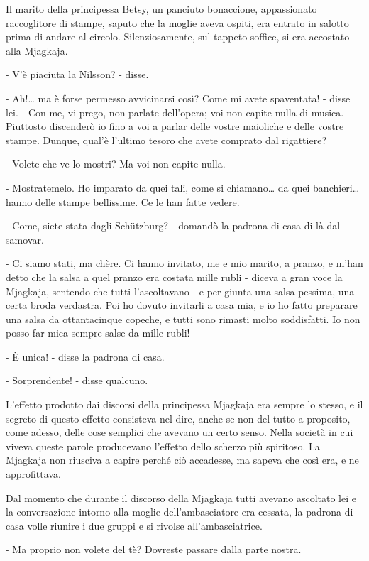 Il marito della principessa Betsy, un panciuto bonaccione, appassionato raccoglitore di stampe, saputo che la moglie aveva ospiti, era entrato in salotto prima di andare al circolo. Silenziosamente, sul tappeto soffice, si era accostato alla Mjagkaja. 

- V'è piaciuta la Nilsson? - disse. 

- Ah!\ldots{} ma è forse permesso avvicinarsi così? Come mi avete spaventata! - disse lei. - Con me, vi prego, non parlate dell'opera; voi non capite nulla di musica. Piuttosto discenderò io fino a voi a parlar delle vostre maioliche e delle vostre stampe. Dunque, qual'è l'ultimo tesoro che avete comprato dal rigattiere? 

- Volete che ve lo mostri? Ma voi non capite nulla. 

- Mostratemelo. Ho imparato da quei tali, come si chiamano\ldots{} da quei banchieri\ldots{} hanno delle stampe bellissime. Ce le han fatte vedere. 

- Come, siete stata dagli Schützburg? - domandò la padrona di casa di là dal samovar. 

- Ci siamo stati, ma chère. Ci hanno invitato, me e mio marito, a pranzo, e m'han detto che la salsa a quel pranzo era costata mille rubli - diceva a gran voce la Mjagkaja, sentendo che tutti l'ascoltavano - e per giunta una salsa pessima, una certa broda verdastra. Poi ho dovuto invitarli a casa mia, e io ho fatto preparare una salsa da ottantacinque copeche, e tutti sono rimasti molto soddisfatti. Io non posso far mica sempre salse da mille rubli! 

- È unica! - disse la padrona di casa. 

- Sorprendente! - disse qualcuno. 

L'effetto prodotto dai discorsi della principessa Mjagkaja era sempre lo stesso, e il segreto di questo effetto consisteva nel dire, anche se non del tutto a proposito, come adesso, delle cose semplici che avevano un certo senso. Nella società in cui viveva queste parole producevano l'effetto dello scherzo più spiritoso. La Mjagkaja non riusciva a capire perché ciò accadesse, ma sapeva che così era, e ne approfittava. 

Dal momento che durante il discorso della Mjagkaja tutti avevano ascoltato lei e la conversazione intorno alla moglie dell'ambasciatore era cessata, la padrona di casa volle riunire i due gruppi e si rivolse all'ambasciatrice. 

- Ma proprio non volete del tè? Dovreste passare dalla parte nostra. 

